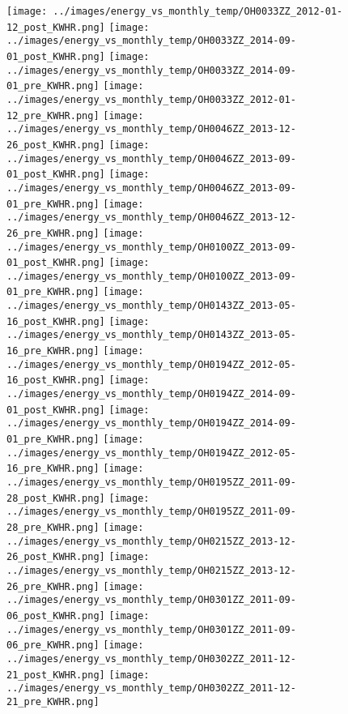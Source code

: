 \clearpage
\begin{figure}
\centering
\texttt{[image: ../images/energy\_vs\_monthly\_temp/OH0033ZZ\_2012-01-12\_post\_KWHR.png]}
\texttt{[image: ../images/energy\_vs\_monthly\_temp/OH0033ZZ\_2014-09-01\_post\_KWHR.png]}
\texttt{[image: ../images/energy\_vs\_monthly\_temp/OH0033ZZ\_2014-09-01\_pre\_KWHR.png]}
\texttt{[image: ../images/energy\_vs\_monthly\_temp/OH0033ZZ\_2012-01-12\_pre\_KWHR.png]}
\texttt{[image: ../images/energy\_vs\_monthly\_temp/OH0046ZZ\_2013-12-26\_post\_KWHR.png]}
\texttt{[image: ../images/energy\_vs\_monthly\_temp/OH0046ZZ\_2013-09-01\_post\_KWHR.png]}
\texttt{[image: ../images/energy\_vs\_monthly\_temp/OH0046ZZ\_2013-09-01\_pre\_KWHR.png]}
\texttt{[image: ../images/energy\_vs\_monthly\_temp/OH0046ZZ\_2013-12-26\_pre\_KWHR.png]}
\texttt{[image: ../images/energy\_vs\_monthly\_temp/OH0100ZZ\_2013-09-01\_post\_KWHR.png]}
\texttt{[image: ../images/energy\_vs\_monthly\_temp/OH0100ZZ\_2013-09-01\_pre\_KWHR.png]}
\texttt{[image: ../images/energy\_vs\_monthly\_temp/OH0143ZZ\_2013-05-16\_post\_KWHR.png]}
\texttt{[image: ../images/energy\_vs\_monthly\_temp/OH0143ZZ\_2013-05-16\_pre\_KWHR.png]}
\texttt{[image: ../images/energy\_vs\_monthly\_temp/OH0194ZZ\_2012-05-16\_post\_KWHR.png]}
\texttt{[image: ../images/energy\_vs\_monthly\_temp/OH0194ZZ\_2014-09-01\_post\_KWHR.png]}
\texttt{[image: ../images/energy\_vs\_monthly\_temp/OH0194ZZ\_2014-09-01\_pre\_KWHR.png]}
\texttt{[image: ../images/energy\_vs\_monthly\_temp/OH0194ZZ\_2012-05-16\_pre\_KWHR.png]}
\texttt{[image: ../images/energy\_vs\_monthly\_temp/OH0195ZZ\_2011-09-28\_post\_KWHR.png]}
\texttt{[image: ../images/energy\_vs\_monthly\_temp/OH0195ZZ\_2011-09-28\_pre\_KWHR.png]}
\texttt{[image: ../images/energy\_vs\_monthly\_temp/OH0215ZZ\_2013-12-26\_post\_KWHR.png]}
\texttt{[image: ../images/energy\_vs\_monthly\_temp/OH0215ZZ\_2013-12-26\_pre\_KWHR.png]}
\texttt{[image: ../images/energy\_vs\_monthly\_temp/OH0301ZZ\_2011-09-06\_post\_KWHR.png]}
\texttt{[image: ../images/energy\_vs\_monthly\_temp/OH0301ZZ\_2011-09-06\_pre\_KWHR.png]}
\texttt{[image: ../images/energy\_vs\_monthly\_temp/OH0302ZZ\_2011-12-21\_post\_KWHR.png]}
\texttt{[image: ../images/energy\_vs\_monthly\_temp/OH0302ZZ\_2011-12-21\_pre\_KWHR.png]}
\end{figure}
